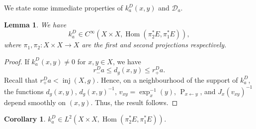 \documentclass[a4paper,oneside,12pt]{amsart}
\theoremstyle{plain}
\newtheorem{lemma}[theorem]{Lemma}
\newtheorem{corollary}[theorem]{Corollary}
\theoremstyle{definition}
\theoremstyle{remark}
\DeclareMathOperator{\Hom}{Hom}
\DeclareMathOperator{\injectivityradius}{inj}
\newcommand{\paralleltransport}[2]{\operatorname{P}_{#2 \gets #1}}
\newcommand{\mesoscopicDiracoperator}[1][a]{\mathcal{D}_{#1}}
\newcommand{\integralkernel}{k}
\newcommand{\kernelDirac}{\integralkernel_a^D}
\begin{document}
We state some immediate properties of $\kernelDirac(x,y)$ and $\mesoscopicDiracoperator$.

\begin{lemma}\label{lemma: smoothness of Dirac kernel}
  We have
  \begin{equation}
    \kernelDirac \in C^{\infty}(X \times X, \Hom(\pi_2^* E, \pi_1^* E)),
  \end{equation}
  where $\pi_1, \pi_2 \colon X \times X \to X$ are the first and second projections respectively.
\end{lemma}
\begin{proof}
  If $\kernelDirac(x,y) \ne 0$ for $x,y \in X$, we have
  \begin{equation}
    r_-^D a \le d_g(x,y) \le r_+^D a.
  \end{equation}
  Recall that $r_+^D a < \injectivityradius(X,g)$.
  Hence, on a neighbourhood of the support of $\kernelDirac$, the functions $d_g(x,y)$, $d_g(x,y)^{-1}$, $v_{xy} = \exp_x^{-1}(y)$, $\paralleltransport{y}{x}$, and $J_x(v_{xy})^{-1}$ depend smoothly on $(x,y)$.
  Thus, the result follows.
\end{proof}

\begin{corollary}\label{corollary: Dirac kernel is L2}
  $\kernelDirac \in L^2(X \times X, \Hom(\pi_2^* E, \pi_1^* E))$.
\end{corollary}
\end{document}
